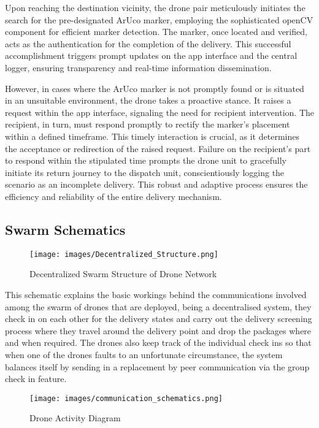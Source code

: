 \documentclass[preprint,12pt]{elsarticle}
\begin{document}
Upon reaching the destination vicinity, the drone pair meticulously initiates the search for the pre-designated ArUco marker, employing the sophisticated openCV component for efficient marker detection. The marker, once located and verified, acts as the authentication for the completion of the delivery. This successful accomplishment triggers prompt updates on the app interface and the central logger, ensuring transparency and real-time information dissemination.

However, in cases where the ArUco marker is not promptly found or is situated in an unsuitable environment, the drone takes a proactive stance. It raises a request within the app interface, signaling the need for recipient intervention. The recipient, in turn, must respond promptly to rectify the marker's placement within a defined timeframe. This timely interaction is crucial, as it determines the acceptance or redirection of the raised request. Failure on the recipient's part to respond within the stipulated time prompts the drone unit to gracefully initiate its return journey to the dispatch unit, conscientiously logging the scenario as an incomplete delivery. This robust and adaptive process ensures the efficiency and reliability of the entire delivery mechanism.

\subsection{Swarm Schematics}
\begin{figure}[!htbp]
    \centering
    \texttt{[image: images/Decentralized\_Structure.png]}
    \caption{Decentralized Swarm Structure of Drone Network}
\end{figure}

This schematic explains the basic workings behind the communications involved among the swarm of drones that are deployed, being a decentralised system, they check in on each other for the delivery states and carry out the delivery screening process where they travel around the delivery point and drop the packages where and when required. The drones also keep track of the individual check ins so that when one of the drones faults to an unfortunate circumstance, the system balances itself by sending in a replacement by peer communication via the group check in feature.\\

\begin{figure}[!htbp]
    \centering
    \texttt{[image: images/communication\_schematics.png]}
    \caption{Drone Activity Diagram}
\end{figure}
\end{document}
